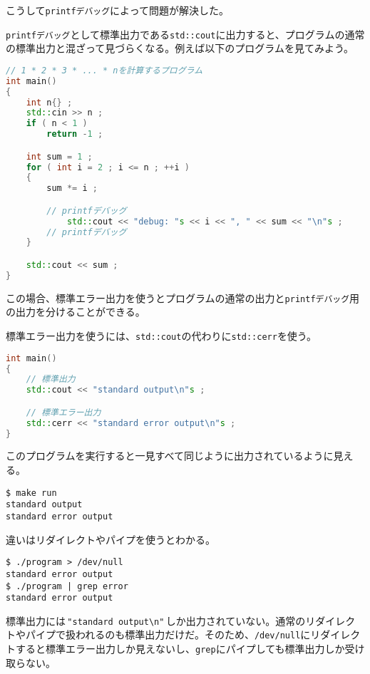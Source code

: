 こうして\texttt{printfデバッグ}によって問題が解決した。

\clearpage
{}

\texttt{printfデバッグ}として標準出力である\texttt{std::cout}に出力すると、プログラムの通常の標準出力と混ざって見づらくなる。例えば以下のプログラムを見てみよう。

\begin{lstlisting}[language={C++}]
// 1 * 2 * 3 * ... * nを計算するプログラム
int main()
{
    int n{} ;
    std::cin >> n ;
    if ( n < 1 )
        return -1 ;

    int sum = 1 ;  
    for ( int i = 2 ; i <= n ; ++i )
    {
        sum *= i ;

        // printfデバッグ
            std::cout << "debug: "s << i << ", " << sum << "\n"s ;
        // printfデバッグ
    }

    std::cout << sum ;
}
\end{lstlisting}

この場合、標準エラー出力を使うとプログラムの通常の出力と\texttt{printfデバッグ}用の出力を分けることができる。

標準エラー出力を使うには、\texttt{std::cout}の代わりに\texttt{std::cerr}を使う。

\begin{lstlisting}[language={C++}]
int main()
{
    // 標準出力
    std::cout << "standard output\n"s ;

    // 標準エラー出力
    std::cerr << "standard error output\n"s ;
}
\end{lstlisting}

このプログラムを実行すると一見すべて同じように出力されているように見える。

\begin{lstlisting}[style=terminal]
$ make run
standard output
standard error output
\end{lstlisting}

違いはリダイレクトやパイプを使うとわかる。

\begin{lstlisting}[style=terminal]
$ ./program > /dev/null
standard error output
$ ./program | grep error
standard error output 
\end{lstlisting}

標準出力には\,\texttt{"standard output{\textbackslash}n"}\,しか出力されていない。通常のリダイレクトやパイプで扱われるのも標準出力だけだ。そのため、\texttt{/dev/null}にリダイレクトすると標準エラー出力しか見えないし、\texttt{grep}にパイプしても標準出力しか受け取らない。

